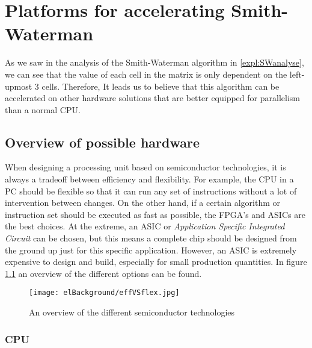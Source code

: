 
\chapter{Platforms for accelerating Smith-Waterman}
\label{ch:Platforms}

As we saw in the analysis of the Smith-Waterman algorithm in \ref{expl:SWanalyse}, we can see that the value of each cell in the matrix is only dependent on the left-upmost 3 cells. Therefore, It leads us to believe that this algorithm can be accelerated on other hardware solutions that are better equipped for parallelism than a normal CPU.

\section{Overview of possible hardware}

When designing a processing unit based on semiconductor technologies, it is always a tradeoff between efficiency and flexibility. For example, the CPU in a PC should be flexible so that it can run any set of instructions without a lot of intervention between changes. On the other hand, if a certain algorithm or instruction set should be executed as fast as possible, the FPGA's and ASICs are the best choices. At the extreme, an ASIC or \emph{Application Specific Integrated Circuit} can be chosen, but this means a complete chip should be designed from the ground up just for this specific application. However, an ASIC is extremely expensive to design and build, especially for small production quantities. In figure \ref{fig:effVSflex} an overview of the different options can be found.

\begin{figure}[H]
	\centering
	\texttt{[image: elBackground/effVSflex.jpg]}
	\caption{An overview of the different semiconductor technologies}
	\label{fig:effVSflex}
\end{figure}

\subsection{CPU}

